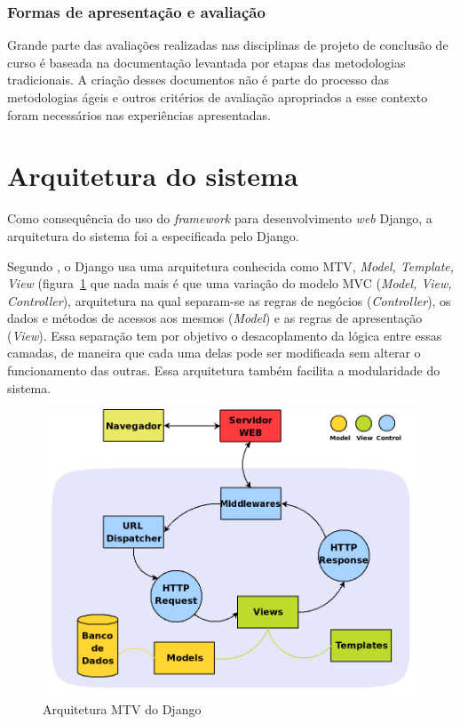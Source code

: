     \subsubsection{Formas de apresentação e avaliação}
      Grande parte das avaliações realizadas nas disciplinas de projeto de conclusão de curso é baseada na documentação levantada por etapas das metodologias tradicionais. A criação desses documentos não é parte do processo das metodologias ágeis e outros critérios de avaliação apropriados a esse contexto foram necessários nas experiências apresentadas.

\section{Arquitetura do sistema}

    Como consequência do uso do \textit{framework} para desenvolvimento \textit{web} Django, a arquitetura do sistema foi a especificada pelo Django.

    Segundo , o Django usa uma arquitetura conhecida como MTV, \textit{Model, Template, View} (figura~\ref{django_arquitetura} que nada mais é que uma variação do modelo MVC (\textit{Model, View, Controller}), arquitetura na qual separam-se as regras de negócios (\textit{Controller}), os dados e métodos de acessos aos mesmos (\textit{Model}) e as regras de apresentação (\textit{View}). Essa separação tem por objetivo o desacoplamento da lógica entre essas camadas, de maneira que cada uma delas pode ser modificada sem alterar o funcionamento das outras. Essa arquitetura também facilita a modularidade do sistema.

    \begin{figure}[h]
        \begin{center}
    \includegraphics[width=0.7\linewidth]{arquivos/django_arquitetura.png}
        \end{center}
        \caption{Arquitetura MTV do Django}
        \label{django_arquitetura}
    \end{figure}

